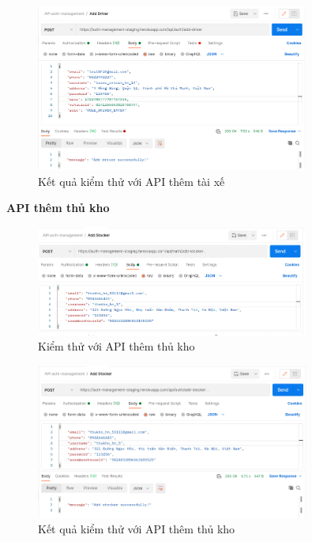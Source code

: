 		\begin{figure}[!ht]
			\includegraphics[width=0.8\textwidth]{Images/testing/API-add-driver-result.png}
			\centering
			\linebreak
			\caption{Kết quả kiểm thử với API thêm tài xế}
		\end{figure}
		
		\newpage
		
		\textbf{API thêm thủ kho}
		
		\begin{figure}[!ht]
			\includegraphics[width=0.8\textwidth]{Images/testing/API-add-stocker.png}
			\centering
			\linebreak
			\caption{Kiểm thử với API thêm thủ kho}
		\end{figure}
		
		\begin{figure}[!ht]
			\includegraphics[width=0.8\textwidth]{Images/testing/API-add-stocker-result.png}
			\centering
			\linebreak
			\caption{Kết quả kiểm thử với API thêm thủ kho}
		\end{figure}
		
